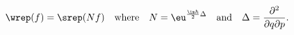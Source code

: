 \begin{equation}
    \label{eq:wrep}
    \wrep (f) = \srep(Nf)
    \quad
    \textrm{where}
    \quad
    N = \eu^{\frac{\im\hbar}{2}\Delta}
    \quad
    \textrm{and}
    \quad
    \Delta = \frac{\partial^2}{\partial q \partial p}.
\end{equation}

